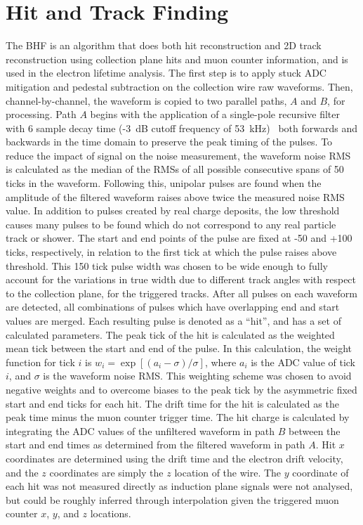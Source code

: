 \documentclass[10pt,a4paper]{article}
\begin{document}
\linenumbers

\section{Hit and Track Finding}\label{sec:hitstracks}

The BHF is an algorithm that does both hit reconstruction and 2D track reconstruction using collection plane hits and muon counter information, and is used in the electron lifetime analysis. The first step is to apply stuck ADC mitigation and pedestal subtraction on the collection wire raw waveforms. Then, channel-by-channel, the waveform is copied to two parallel paths, $A$ and $B$, for processing. Path $A$ begins with the application of a single-pole recursive filter with 6 sample decay time (-3~dB cutoff frequency of 53~kHz)~\cite{dsp-book} both forwards and backwards in the time domain to preserve the peak timing of the pulses. To reduce the impact of signal on the noise measurement, the waveform noise RMS is calculated as the median of the RMSs of all possible consecutive spans of 50 ticks in the waveform. Following this, unipolar pulses are found when the amplitude of the filtered waveform raises above twice the measured noise RMS value. In addition to pulses created by real charge deposits, the low threshold causes many pulses to be found which do not correspond to any real particle track or shower. The start and end points of the pulse are fixed at -50 and +100 ticks, respectively, in relation to the first tick at which the pulse raises above threshold. This 150 tick pulse width was chosen to be wide enough to fully account for the variations in true width due to different track angles with respect to the collection plane, for the triggered tracks. After all pulses on each waveform are detected, all combinations of pulses which have overlapping end and start values are merged. Each resulting pulse is denoted as a ``hit'', and has a set of calculated parameters. The peak tick of the hit is calculated as the weighted mean tick between the start and end of the pulse. In this calculation, the weight function for tick $i$ is $w_i = \exp\left[(a_i-\sigma)/\sigma\right]$, where $a_i$ is the ADC value of tick $i$, and $\sigma$ is the waveform noise RMS. This weighting scheme was chosen to avoid negative weights and to overcome biases to the peak tick by the asymmetric fixed start and end ticks for each hit. The drift time for the hit is calculated as the peak time minus the muon counter trigger time. The hit charge is calculated by integrating the ADC values of the unfiltered waveform in path $B$ between the start and end times as determined from the filtered waveform in path $A$. Hit $x$ coordinates are determined using the drift time and the electron drift velocity, and the $z$ coordinates are simply the $z$ location of the wire. The $y$ coordinate of each hit was not measured directly as induction plane signals were not analysed, but could be roughly inferred through interpolation given the triggered muon counter $x$, $y$, and $z$ locations.
\end{document}
